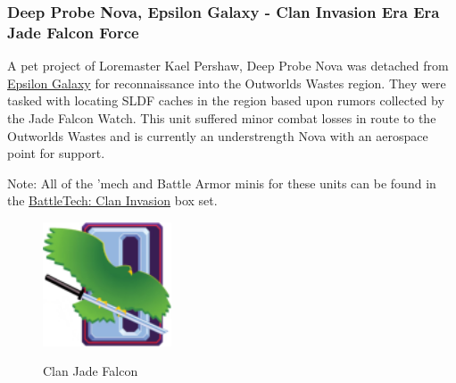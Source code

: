 \subsubsection{Deep Probe Nova, Epsilon Galaxy - Clan Invasion Era Era Jade Falcon Force}

A pet project of Loremaster Kael Pershaw, Deep Probe Nova was detached from \href{https://www.sarna.net/wiki/Epsilon_Galaxy_(Clan_Jade_Falcon)}{Epsilon Galaxy} for reconnaissance into the Outworlds Wastes region.
They were tasked with locating SLDF caches in the region based upon rumors collected by the Jade Falcon Watch.
This unit suffered minor combat losses in route to the Outworlds Wastes and is currently an understrength Nova with an aerospace point for support.
          	
Note: All of the 'mech and Battle Armor minis for these units can be found in the \href{https://www.sarna.net/wiki/BattleTech:_Clan_Invasion}{BattleTech: Clan Invasion} box set.

\begin{figure}[!h]
  \centering
  \includegraphics[alt='Clan Jade Falcon Logo', width=1.5in, height=1.444in]{img/Jade-Falcon.png}
  \caption*{Clan Jade Falcon}
\end{figure}

